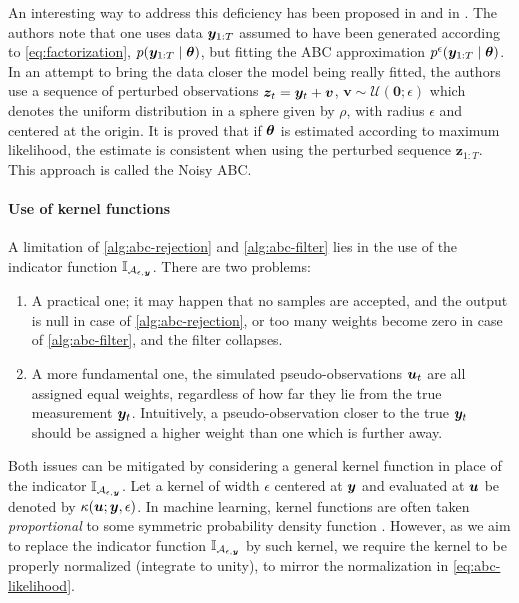 An interesting way to address this deficiency has been proposed in \cite{noisy-abc1} and in \cite{noisy-abc2}. The authors note that one uses data $\bm{y}_{1:T}$ assumed to have been generated according to \eqref{eq:factorization}, $p(\bm{y}_{1:T} \mid \bm{\theta})$, but fitting the ABC approximation $p^\epsilon(\bm{y}_{1:T} \mid \bm{\theta})$. In an attempt to bring the data closer the model being really fitted, the authors use a sequence of perturbed observations $\bm{z}_t = \bm{y}_t + \bm{v}$, $\bm{v} \sim \mathcal{U}(\bm{0}; \epsilon)$ which denotes the uniform distribution in a sphere given by $\rho$, with radius $\epsilon$ and centered at the origin. It is proved that if $\bm{\theta}$ is estimated according to maximum likelihood, the estimate is consistent when using the perturbed sequence $\bm{z}_{1:T}$. This approach is called the Noisy ABC.


\paragraph{Use of kernel functions}
A limitation of \autoref{alg:abc-rejection} and \autoref{alg:abc-filter} lies in the use of the indicator function $\mathbb{I}_{\mathcal{A}_{\epsilon, \bm{y}}}$. There are two problems:
\begin{enumerate}
    \item A practical one; it may happen that no samples are accepted, and the output is null in case of \autoref{alg:abc-rejection}, or too many weights become zero in case of \autoref{alg:abc-filter}, and the filter collapses.
    \item A more fundamental one, the simulated pseudo-observations $\bm{u}_t$ are all assigned equal weights, regardless of how far they lie from the true measurement $\bm{y}_t$. Intuitively, a pseudo-observation closer to the true $\bm{y}_t$ should be assigned a higher weight than one which is further away.
\end{enumerate}
Both issues can be mitigated by considering a general kernel function in place of the indicator $\mathbb{I}_{\mathcal{A}_{\epsilon, \bm{y}}}$. Let a kernel of width $\epsilon$ centered at $\bm{y}$ and evaluated at $\bm{u}$ be denoted by $\kappa(\bm{u}; \bm{y}, \epsilon)$. In machine learning, kernel functions are often taken \emph{proportional} to some symmetric probability density function \citep{elements}. However, as we aim to replace the indicator function $\mathbb{I}_{\mathcal{A}_{\epsilon, \bm{y}}}$ by such kernel, we require the kernel to be properly normalized (integrate to unity), to mirror the normalization in \eqref{eq:abc-likelihood}.

